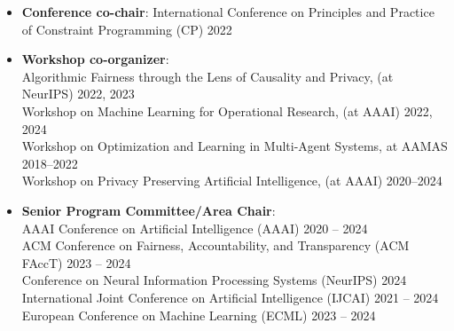 \documentclass[localFont,alternative]{documentMETADATA}
\begin{document}

  \begin{itemize}
    \item {\bf Conference co-chair}:  
    {International Conference on Principles and Practice of Constraint Programming (CP)}  \hfill{2022}


    \item {\bf Workshop co-organizer}: \\
    {Algorithmic Fairness through the Lens of Causality and Privacy, (at NeurIPS)} \hfill{2022, 2023}\\
    {Workshop on Machine Learning for Operational Research, (at AAAI)}   \hfill{2022, 2024}\\
    {Workshop on Optimization and Learning in Multi-Agent Systems, at AAMAS} \hfill{2018--2022}\\
    {Workshop on Privacy Preserving Artificial Intelligence, (at AAAI)}   \hfill{2020--2024}
    
    \item {\bf Senior Program Committee/Area Chair}: \\
    AAAI Conference on Artificial Intelligence (AAAI) \hfill {2020 -- 2024}\\
		ACM Conference on Fairness, Accountability, and Transparency (ACM FAccT) \hfill {2023 -- 2024}\\
    Conference on Neural Information Processing Systems (NeurIPS) \hfill {2024}\\
    International Joint Conference on Artificial Intelligence (IJCAI) \hfill {2021 -- 2024}\\
    European Conference on Machine Learning (ECML) \hfill{2023 -- 2024}


 
  \end{itemize}
\end{document}
